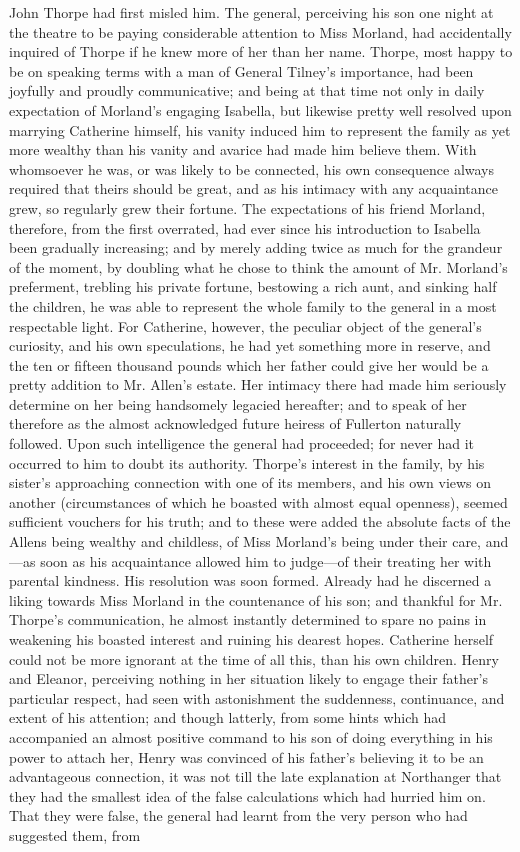 John Thorpe had first misled him. The general, perceiving his son one night at the theatre to be paying considerable attention to Miss Morland, had accidentally inquired of Thorpe if he knew more of her than her name. Thorpe, most happy to be on speaking terms with a man of General Tilney's importance, had been joyfully and proudly communicative; and being at that time not only in daily expectation of Morland's engaging Isabella, but likewise pretty well resolved upon marrying Catherine himself, his vanity induced him to represent the family as yet more wealthy than his vanity and avarice had made him believe them. With whomsoever he was, or was likely to be connected, his own consequence always required that theirs should be great, and as his intimacy with any acquaintance grew, so regularly grew their fortune. The expectations of his friend Morland, therefore, from the first overrated, had ever since his introduction to Isabella been gradually increasing; and by merely adding twice as much for the grandeur of the moment, by doubling what he chose to think the amount of Mr. Morland's preferment, trebling his private fortune, bestowing a rich aunt, and sinking half the children, he was able to represent the whole family to the general in a most respectable light. For Catherine, however, the peculiar object of the general's curiosity, and his own speculations, he had yet something more in reserve, and the ten or fifteen thousand pounds which her father could give her would be a pretty addition to Mr. Allen's estate. Her intimacy there had made him seriously determine on her being handsomely legacied hereafter; and to speak of her therefore as the almost acknowledged future heiress of Fullerton naturally followed. Upon such intelligence the general had proceeded; for never had it occurred to him to doubt its authority. Thorpe's interest in the family, by his sister's approaching connection with one of its members, and his own views on another (circumstances of which he boasted with almost equal openness), seemed sufficient vouchers for his truth; and to these were added the absolute facts of the Allens being wealthy and childless, of Miss Morland's being under their care, and---as soon as his acquaintance allowed him to judge---of their treating her with parental kindness. His resolution was soon formed. Already had he discerned a liking towards Miss Morland in the countenance of his son; and thankful for Mr. Thorpe's communication, he almost instantly determined to spare no pains in weakening his boasted interest and ruining his dearest hopes. Catherine herself could not be more ignorant at the time of all this, than his own children. Henry and Eleanor, perceiving nothing in her situation likely to engage their father's particular respect, had seen with astonishment the suddenness, continuance, and extent of his attention; and though latterly, from some hints which had accompanied an almost positive command to his son of doing everything in his power to attach her, Henry was convinced of his father's believing it to be an advantageous connection, it was not till the late explanation at Northanger that they had the smallest idea of the false calculations which had hurried him on. That they were false, the general had learnt from the very person who had suggested them, from 